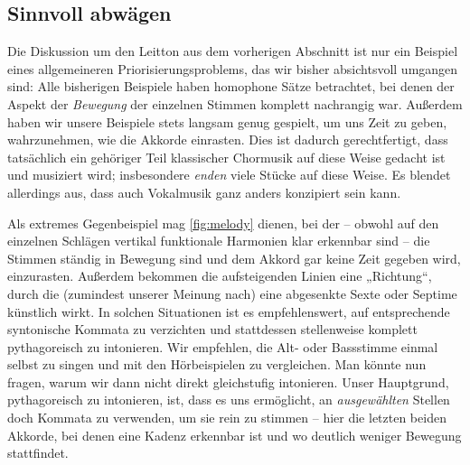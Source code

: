 \subsection{Sinnvoll abwägen}
\label{sec:balance}

Die Diskussion um den Leitton aus dem vorherigen Abschnitt ist nur ein Beispiel
eines allgemeineren Priorisierungsproblems, das wir bisher absichtsvoll umgangen
sind: Alle bisherigen Beispiele haben homophone Sätze betrachtet, bei denen der
Aspekt der \emph{Bewegung} der einzelnen Stimmen komplett nachrangig
 war. Außerdem haben
wir unsere Beispiele stets langsam genug gespielt, um uns Zeit zu geben,
wahrzunehmen, wie die Akkorde einrasten. Dies ist dadurch gerechtfertigt, dass
tatsächlich ein gehöriger Teil klassischer Chormusik auf diese Weise gedacht ist
und musiziert wird; insbesondere \emph{enden} viele Stücke auf diese Weise. Es
blendet allerdings aus, dass auch Vokalmusik ganz anders konzipiert sein kann.

Als extremes Gegenbeispiel mag \cref{fig:melody} dienen, bei der – obwohl auf
den einzelnen Schlägen vertikal funktionale Harmonien klar erkennbar sind – die
Stimmen ständig in Bewegung sind und dem Akkord gar keine Zeit gegeben wird,
einzurasten. Außerdem bekommen die aufsteigenden Linien eine „Richtung“, durch
die (zumindest unserer
Meinung nach) eine abgesenkte Sexte oder Septime künstlich wirkt.  In solchen
Situationen ist es empfehlenswert, auf entsprechende syntonische Kommata zu
verzichten und stattdessen stellenweise komplett pythagoreisch zu intonieren.
  Wir empfehlen, die
Alt- oder Bassstimme einmal selbst zu singen und mit den Hörbeispielen zu
vergleichen.  Man könnte nun fragen, warum wir dann nicht direkt gleichstufig
intonieren.  Unser Hauptgrund, pythagoreisch zu intonieren, ist, dass es uns
ermöglicht, an \emph{ausgewählten} Stellen doch Kommata zu verwenden, um sie
rein zu stimmen – hier die letzten beiden Akkorde, bei denen eine Kadenz
erkennbar ist und wo deutlich weniger Bewegung stattfindet.

